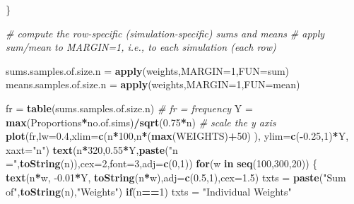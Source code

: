 \documentclass[
]{article}
\newenvironment{Shaded}{\begin{snugshade}}{\end{snugshade}}
\newcommand{\CommentTok}[1]{\textcolor[rgb]{0.56,0.35,0.01}{\textit{#1}}}
\newcommand{\ControlFlowTok}[1]{\textcolor[rgb]{0.13,0.29,0.53}{\textbf{#1}}}
\newcommand{\DataTypeTok}[1]{\textcolor[rgb]{0.13,0.29,0.53}{#1}}
\newcommand{\DecValTok}[1]{\textcolor[rgb]{0.00,0.00,0.81}{#1}}
\newcommand{\FloatTok}[1]{\textcolor[rgb]{0.00,0.00,0.81}{#1}}
\newcommand{\KeywordTok}[1]{\textcolor[rgb]{0.13,0.29,0.53}{\textbf{#1}}}
\newcommand{\NormalTok}[1]{#1}
\newcommand{\OperatorTok}[1]{\textcolor[rgb]{0.81,0.36,0.00}{\textbf{#1}}}
\newcommand{\StringTok}[1]{\textcolor[rgb]{0.31,0.60,0.02}{#1}}
\begin{document}
\begin{Shaded}
\begin{Highlighting}[]
\NormalTok{   \} }
  
   \CommentTok{# compute the row-specific (simulation-specific) sums and means}
   \CommentTok{# apply sum/mean to MARGIN=1, i.e., to each simulation (each row)}

\NormalTok{   sums.samples.of.size.n =}\StringTok{ }\KeywordTok{apply}\NormalTok{(weights,}\DataTypeTok{MARGIN=}\DecValTok{1}\NormalTok{,}\DataTypeTok{FUN=}\NormalTok{sum)}
\NormalTok{   means.samples.of.size.n =}\StringTok{ }\KeywordTok{apply}\NormalTok{(weights,}\DataTypeTok{MARGIN=}\DecValTok{1}\NormalTok{,}\DataTypeTok{FUN=}\NormalTok{mean)}

\NormalTok{   fr =}\StringTok{ }\KeywordTok{table}\NormalTok{(sums.samples.of.size.n)          }\CommentTok{# fr = frequency}
\NormalTok{   Y =}\StringTok{ }\KeywordTok{max}\NormalTok{(Proportions}\OperatorTok{*}\NormalTok{no.of.sims)}\OperatorTok{/}\KeywordTok{sqrt}\NormalTok{(}\FloatTok{0.75}\OperatorTok{*}\NormalTok{n) }\CommentTok{# scale the y axis}
   \KeywordTok{plot}\NormalTok{(fr,}\DataTypeTok{lw=}\FloatTok{0.4}\NormalTok{,}\DataTypeTok{xlim=}\KeywordTok{c}\NormalTok{(n}\OperatorTok{*}\DecValTok{100}\NormalTok{,n}\OperatorTok{*}\NormalTok{(}\KeywordTok{max}\NormalTok{(WEIGHTS)}\OperatorTok{+}\DecValTok{50}\NormalTok{) ), }
                  \DataTypeTok{ylim=}\KeywordTok{c}\NormalTok{(}\OperatorTok{-}\FloatTok{0.25}\NormalTok{,}\DecValTok{1}\NormalTok{)}\OperatorTok{*}\NormalTok{Y, }\DataTypeTok{xaxt=}\StringTok{"n"}\NormalTok{)}
   \KeywordTok{text}\NormalTok{(n}\OperatorTok{*}\DecValTok{320}\NormalTok{,}\FloatTok{0.55}\OperatorTok{*}\NormalTok{Y,}\KeywordTok{paste}\NormalTok{(}\StringTok{"n ="}\NormalTok{,}\KeywordTok{toString}\NormalTok{(n)),}\DataTypeTok{cex=}\DecValTok{2}\NormalTok{,}\DataTypeTok{font=}\DecValTok{3}\NormalTok{,}\DataTypeTok{adj=}\KeywordTok{c}\NormalTok{(}\DecValTok{0}\NormalTok{,}\DecValTok{1}\NormalTok{))}
   \ControlFlowTok{for}\NormalTok{(w }\ControlFlowTok{in} \KeywordTok{seq}\NormalTok{(}\DecValTok{100}\NormalTok{,}\DecValTok{300}\NormalTok{,}\DecValTok{20}\NormalTok{)) \{}
     \KeywordTok{text}\NormalTok{(n}\OperatorTok{*}\NormalTok{w, }\FloatTok{-0.01}\OperatorTok{*}\NormalTok{Y, }\KeywordTok{toString}\NormalTok{(n}\OperatorTok{*}\NormalTok{w),}\DataTypeTok{adj=}\KeywordTok{c}\NormalTok{(}\FloatTok{0.5}\NormalTok{,}\DecValTok{1}\NormalTok{),}\DataTypeTok{cex=}\FloatTok{1.5}\NormalTok{)}
\NormalTok{     txts =}\StringTok{ }\KeywordTok{paste}\NormalTok{(}\StringTok{"Sum of"}\NormalTok{,}\KeywordTok{toString}\NormalTok{(n),}\StringTok{"Weights"}\NormalTok{)}
     \ControlFlowTok{if}\NormalTok{(n}\OperatorTok{==}\DecValTok{1}\NormalTok{) txts =}\StringTok{ "Individual Weights"}

\end{Highlighting}
\end{Shaded}
\end{document}
